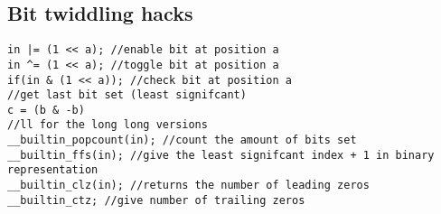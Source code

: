 \subsection{Bit twiddling hacks}
\begin{verbatim}
in |= (1 << a); //enable bit at position a
in ^= (1 << a); //toggle bit at position a
if(in & (1 << a)); //check bit at position a
//get last bit set (least signifcant)
c = (b & -b) 
//ll for the long long versions
__builtin_popcount(in); //count the amount of bits set
__builtin_ffs(in); //give the least signifcant index + 1 in binary representation
__builtin_clz(in); //returns the number of leading zeros
__builtin_ctz; //give number of trailing zeros
\end{verbatim}